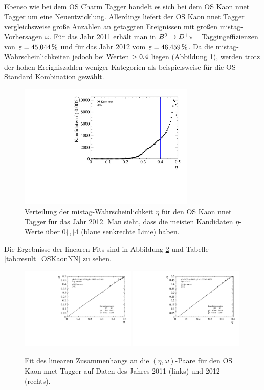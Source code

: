 Ebenso wie bei dem OS Charm Tagger handelt es sich bei dem OS Kaon nnet Tagger um eine Neuentwicklung. Allerdings liefert der OS Kaon nnet Tagger vergleichsweise große Anzahlen an getaggten Ereignissen mit großen mistag-Vorhersagen $\omega$. Für das Jahr \num{2011} erhält man in ${{B}^0}\rightarrow{\ensuremath{{D}^+}}{\ensuremath{{\pi}^-}}$ Taggingeffizienzen von $\varepsilon=\SI{45{,}044}{\%}$ und für das Jahr \num{2012} vom $\varepsilon=\SI{46{,}459}{\%}$. Da die mistag-Wahrscheinlichkeiten jedoch bei Werten $>\num{0{,}4}$ liegen (Abbildung \ref{fig:eta_oskaon}), werden trotz der hohen Ereigniszahlen weniger Kategorien als beispielsweise für die OS Standard Kombination gewählt. 
\begin{figure}[htbp]
	\centering
		\includegraphics[width=0.75\textwidth]{fig/Eta_OSKaon.pdf}
	\caption{Verteilung der mistag-Wahrscheinlichkeit $\eta$ für den OS Kaon nnet Tagger für das Jahr \num{2012}. Man sieht, dass die meisten Kandidaten $\eta$-Werte über \num{0{,}4} (blaue senkrechte Linie) haben.}
	\label{fig:eta_oskaon} 
\end{figure} 
Die Ergebnisse der linearen Fits sind in Abbildung \ref{fig:fit_OSKaonNN} und Tabelle \ref{tab:result_OSKaonNN} zu sehen.
\begin{figure}[htbp]
	\centering
		\includegraphics[width=0.49\textwidth]{fig/2011_OSKaonNN.pdf}
		\includegraphics[width=0.49\textwidth]{fig/2012_OSKaonNN.pdf}
	\caption{Fit des linearen Zusammenhangs an die $(\eta,\omega)$-Paare für den OS Kaon nnet Tagger auf Daten des Jahres \num{2011} (links) und \num{2012} (rechts).}
	\label{fig:fit_OSKaonNN} 
\end{figure} 
